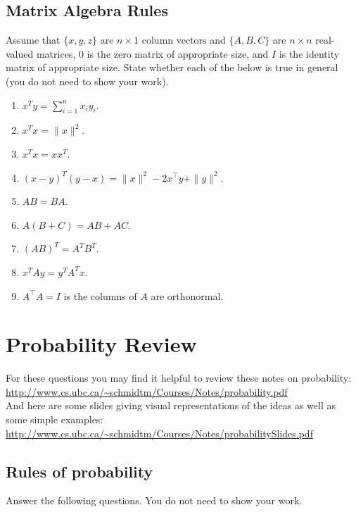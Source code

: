 \documentclass{article}
\def\blu#1{{\color{blu}#1}}
\def\norm#1{\|#1\|}
\begin{document}
\subsection{Matrix Algebra Rules}

Assume that $\{x,y,z\}$ are $n \times 1$ column vectors and $\{A,B,C\}$ are $n \times n$ real-valued matrices, $0$ is the zero matrix of appropriate size, and $I$ is the identity matrix of appropriate size. \blu{State whether each of the below is true in general} (you do not need to show your work).

\begin{enumerate}
\item $x^Ty = \sum_{i=1}^n x_iy_i$.
\item $x^Tx = \norm{x}^2$.
\item $x^Tx = xx^T$.
\item $(x-y)^T(y-x) = \norm{x}^2 - 2x^\top y + \norm{y}^2$.
\item $AB=BA$.
\item $A(B + C) = AB + AC$.
\item $(AB)^T = A^TB^T$.
\item $x^TAy = y^TA^Tx$.
\item $A^\top A = I$ is the columns of $A$ are orthonormal.
\end{enumerate}


\section{Probability Review}


For these questions you may find it helpful to review these notes on probability:\\
\url{http://www.cs.ubc.ca/~schmidtm/Courses/Notes/probability.pdf}\\
And here are some slides giving visual representations of the ideas as well as some simple examples:\\
\url{http://www.cs.ubc.ca/~schmidtm/Courses/Notes/probabilitySlides.pdf}

\subsection{Rules of probability}

\blu{Answer the following questions.} You do not need to show your work.
\end{document}
